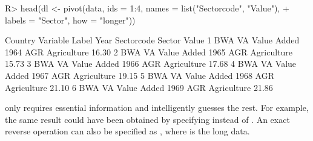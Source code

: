 \documentclass[nojss]{jss} %
\newcommand{\fct}[1]{\code{#1()}}
\begin{document}
\begin{Schunk}
\begin{Sinput}
R> head(dl <- pivot(data, ids = 1:4, names = list("Sectorcode", "Value"),
+    labels = "Sector", how = "longer"))
\end{Sinput}
\begin{Soutput}
  Country Variable       Label Year Sectorcode      Sector Value
1     BWA       VA Value Added 1964        AGR Agriculture 16.30
2     BWA       VA Value Added 1965        AGR Agriculture 15.73
3     BWA       VA Value Added 1966        AGR Agriculture 17.68
4     BWA       VA Value Added 1967        AGR Agriculture 19.15
5     BWA       VA Value Added 1968        AGR Agriculture 21.10
6     BWA       VA Value Added 1969        AGR Agriculture 21.86
\end{Soutput}
\end{Schunk}
%
\fct{pivot} only requires essential information and intelligently guesses the rest. For example, the same result could have been obtained by specifying  instead of . An exact reverse operation can also be specified as , where  is the long data. \newline
\end{document}
